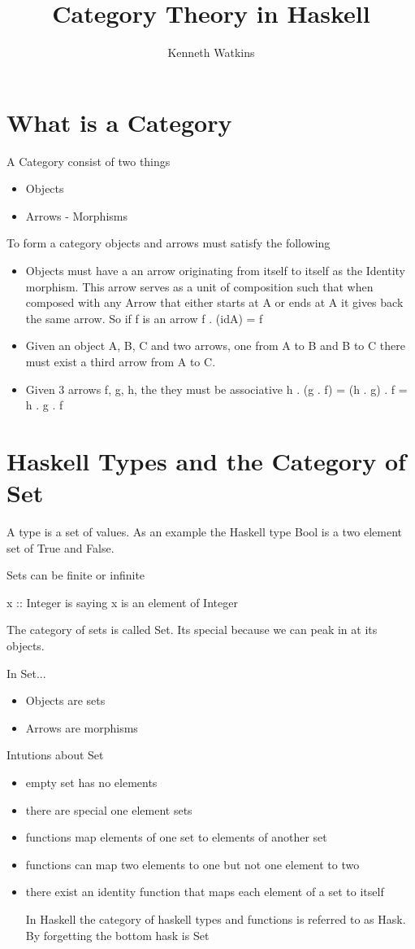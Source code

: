 \documentclass{article}
\title{Category Theory in Haskell}
\author{Kenneth Watkins}
\begin{document}
\maketitle

\section{What is a Category}
A Category consist of two things
\begin{itemize}
  \item Objects
  \item Arrows - Morphisms
\end{itemize}

To form a category objects and arrows must satisfy the following

\begin{itemize}
  \item Objects must have a an arrow originating from itself to itself as the Identity morphism. This arrow serves as a unit of composition such that when composed with any Arrow that either starts at A or ends at A it gives back the same arrow. So if f is an arrow f . (idA) = f
  \item Given an object A, B, C and two arrows, one from A to B and B to C there must exist a third arrow from A to C.
  \item Given 3 arrows f, g, h, the they must be associative h . (g . f) = (h . g) . f = h . g . f
\end{itemize}

\section{Haskell Types and the Category of Set}

A type is a set of values. As an example the Haskell type Bool is a two element set of True and False.

Sets can be finite or infinite

x :: Integer is saying x is an element of Integer

The category of sets is called Set. Its special because we can peak in at its objects.

In Set...
\begin{itemize}
  \item Objects are sets
  \item Arrows are morphisms
\end{itemize}

Intutions about Set
\begin{itemize}
  \item empty set has no elements
  \item there are special one element sets
  \item functions map elements of one set to elements of another set
  \item functions can map two elements to one but not one element to two
  \item there exist an identity function that maps each element of a set to itself

In Haskell the category of haskell types and functions is referred to as Hask. By forgetting the bottom hask is Set
\end{itemize}
\end{document}
